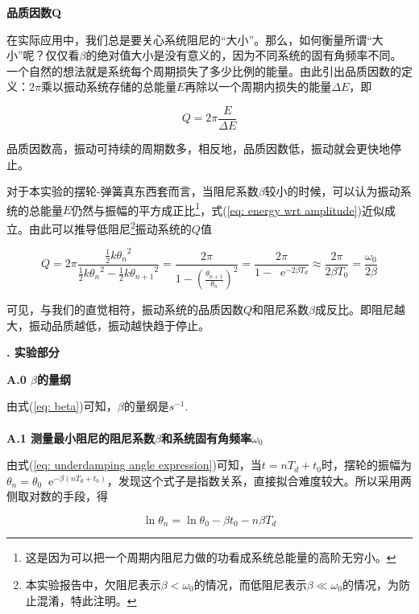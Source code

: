 \documentclass[a4paper,11pt]{article}
\newcommand*{\e}{\mathop{}\!\mathrm{e}}
\begin{document}
        \textbf{品质因数Q}

        在实际应用中，我们总是要关心系统阻尼的“大小”。那么，如何衡量所谓“大小”呢？仅仅看$\beta$的绝对值大小是没有意义的，因为不同系统的固有角频率不同。一个自然的想法就是系统每个周期损失了多少比例的能量。由此引出品质因数的定义：$2\pi$乘以振动系统存储的总能量$E$再除以一个周期内损失的能量$\Delta E$，即

        \begin{equation}
            Q = 2\pi\frac{E}{\Delta E}
        \end{equation}

        品质因数高，振动可持续的周期数多，相反地，品质因数低，振动就会更快地停止。

        对于本实验的摆轮-弹簧真东西套而言，当阻尼系数$\beta$较小的时候，可以认为振动系统的总能量$E$仍然与振幅的平方成正比\footnote{这是因为可以把一个周期内阻尼力做的功看成系统总能量的高阶无穷小。}，式(\ref{eq: energy wrt amplitude})近似成立。由此可以推导低阻尼\footnote{本实验报告中，欠阻尼表示$\beta < \omega_0$的情况，而低阻尼表示$\beta \ll \omega_0$的情况，为防止混淆，特此注明。}振动系统的$Q$值

        \begin{equation}
            Q = 2\pi\frac{\frac{1}{2}k{\theta_n}^2}{\frac{1}{2}k{\theta_n}^2 - \frac{1}{2}k{\theta_{n+1}}^2}
              = \frac{2\pi}{1-(\frac{\theta_{n+1}}{\theta_n})^2}
              = \frac{2\pi}{1-\e^{-2\beta T_d}}
              \approx \frac{2\pi}{2\beta T_0}
              = \frac{\omega_0}{2\beta}
            \label{eq: quality}
        \end{equation}

        可见，与我们的直觉相符，振动系统的品质因数$Q$和阻尼系数$\beta$成反比。即阻尼越大，振动品质越低，振动越快趋于停止。

        \textbf{. 实验部分}

        \textbf{A.0 $\beta$的量纲}

        由式(\ref{eq: beta})可知，$\beta$的量纲是$s^{-1}$.
        \\ \\
        \textbf{A.1 测量最小阻尼的阻尼系数$\beta$和系统固有角频率$\omega_0$}

        由式(\ref{eq: underdamping angle expression})可知，当$t=nT_d + t_0$时，摆轮的振幅为$\theta_n = \theta_0\e^{-\beta(nT_d+t_0)}$，发现这个式子是指数关系，直接拟合难度较大。所以采用两侧取对数的手段，得

        \begin{equation}
            \ln\theta_n = \ln\theta_0 - \beta t_0 - n\beta T_d
        \end{equation}
\end{document}
